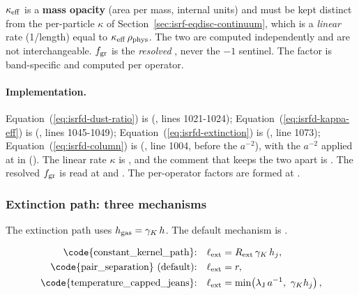 $\kappa_{\rm eff}$ is a \textbf{mass opacity} (area per mass, internal units) and
must be kept distinct from the per-particle $\kappa$ of
Section~\ref{sec:isrf-eqdisc-continuum}, which is a \emph{linear} rate
(1/length) equal to $\kappa_{\rm eff}\,\rho_{\rm phys}$. The two are computed
independently and are not interchangeable.
$f_{\rm gr}$ is the \emph{resolved}
, never the $-1$ sentinel. The
factor is band-specific and computed per operator.

\paragraph{Implementation.} Equation~(\ref{eq:isrfd-dust-ratio}) is
(, lines 1021-1024);
Equation~(\ref{eq:isrfd-kappa-eff}) is 
(, lines 1045-1049);
Equation~(\ref{eq:isrfd-extinction}) is
 (,
line 1073); Equation~(\ref{eq:isrfd-column}) is
(, line 1004, before the $a^{-2}$), with the $a^{-2}$
applied at  in
(). The linear rate $\kappa$ is
, and the comment that keeps the two apart is
. The resolved $f_{\rm gr}$ is read at
 and . The per-operator factors
are formed at .

\subsubsection{Extinction path: three mechanisms}

The extinction path uses
$h_{\rm gas} = \gamma_K\, h$. The default
mechanism is .

\begin{align}
  \text{\code{constant\_kernel\_path}:}\quad
    \ell_{\rm ext} &= R_{\rm ext}\, \gamma_K\, h_j,
  \label{eq:isrfd-path-constant} \\
  \text{\code{pair\_separation} (default):}\quad
    \ell_{\rm ext} &= r,
  \label{eq:isrfd-path-pair} \\
  \text{\code{temperature\_capped\_jeans}:}\quad
    \ell_{\rm ext} &= \min\!\left(\lambda_{\rm J}\, a^{-1},\ \gamma_K h_j\right),
  \label{eq:isrfd-path-jeans}
\end{align}

